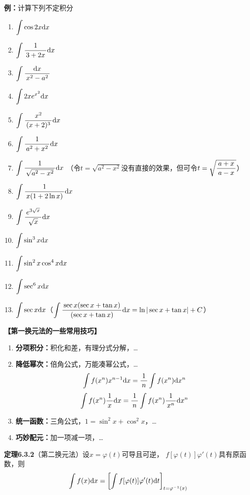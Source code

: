 {\bf 例：}计算下列不定积分
\begin{enumerate}[(1)]
  \setlength{\itemindent}{1cm}
  \item $\dint\cos 2x\d x$ 
  \item $\dint\df 1{3+2x}\d x$
  \item $\dint\df{\d x}{x^2-a^2}$
  \item $\dint 2xe^{x^2}\d x$ 
  \item $\dint\df{x^2}{(x+2)^3}\d x$ 
  \item $\dint\df 1{a^2+x^2}\d x$ 
  \item $\dint\df 1{\sqrt{a^2-x^2}}\d x$ 
  \hfill（令$t=\sqrt{a^2-x^2}$没有直接的效果，但可令$t=\sqrt{\df{a+x}{a-x}}$）
  \item $\dint \df 1{x(1+2\ln x)}\d x$ 
  \item $\dint\df {e^{3\sqrt x}}{\sqrt x}\d x$ 
  \item $\dint \sin^3x\d x$ 
  \item $\dint \sin^2x\cos^4x\d x$ 
  \item $\dint\sec^6x\d x$ 
  \item $\dint\sec x\d x$\hfill（$\dint\df{\sec x(\sec x+\tan x)}{(\sec x+\tan
  x)}\d x=\ln|\sec x+\tan x|+C$）
\end{enumerate}


\begin{shaded}
{\bf 【第一换元法的一些常用技巧】}
\begin{enumerate}
  \setlength{\itemindent}{1cm}
  \item {\bf 分项积分：}积化和差，有理分式分解，\ldots 
  \item {\bf 降低幂次：}倍角公式，万能凑幂公式，\ldots 
    $$\dint f(x^n)x^{n-1}\d x=\df 1n\dint f(x^n)\d x^n$$ 
    $$\dint f(x^n)\df 1x\d x=\df 1n\dint f(x^n)\df{1}{x^n}\d x^n$$ 
  \item {\bf 统一函数：}三角公式，$1=\sin^2x+\cos^2x$，\ldots 
  \item {\bf 巧妙配元：}加一项减一项，\ldots
\end{enumerate}
\end{shaded}

{\bf 定理6.3.2}（第二换元法）设$x=\varphi(t)$可导且可逆，
$f[\varphi(t)]\varphi'(t)$具有原函数，则
$$\dint f(x)\d x=\left[\dint
f[\varphi(t)]\varphi'(t)\d t\right]_{t=\varphi^{-1}(x)}$$

